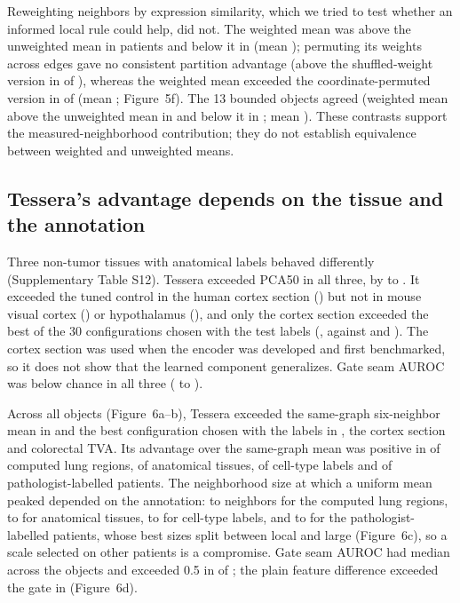 \documentclass[11pt]{article}
\begin{document}
Reweighting neighbors by expression similarity, which we tried to test whether an informed local rule could help, did not. The weighted mean was above the unweighted mean in \HerBndEUSixPos{} patients and below it in \HerBndEUSixNeg{} (mean \HerBndEUSixMean{}); permuting its weights across edges gave no consistent partition advantage (above the shuffled-weight version in \HerBndEShufPos{} of \HerPatients{}), whereas the weighted mean exceeded the coordinate-permuted version in \HerBndECoordPos{} of \HerPatients{} (mean \HerBndECoordMean{}; Figure~5f). The 13 bounded objects agreed (weighted mean above the unweighted mean in \DevAllThirteenEMeanPos{} and below it in \DevAllThirteenEMeanNeg{}; mean \DevAllThirteenEMeanMean{}). These contrasts support the measured-neighborhood contribution; they do not establish equivalence between weighted and unweighted means.





\subsection{Tessera's advantage depends on the tissue and the annotation}
Three non-tumor tissues with anatomical labels behaved differently (Supplementary Table S12). Tessera exceeded PCA50 in all three, by \BrPcaGainMin{} to \BrPcaGainMax{}. It exceeded the tuned control in the human cortex section (\BrCortexTessNested{}) but not in mouse visual cortex (\BrStarmapTessNested{}) or hypothalamus (\BrMerfishTessNested{}), and only the cortex section exceeded the best of the 30 configurations chosen with the test labels (\BrCortexTessOracle{}, against \BrStarmapTessOracle{} and \BrMerfishTessOracle{}). The cortex section was used when the encoder was developed and first benchmarked, so it does not show that the learned component generalizes. Gate seam AUROC was below chance in all three (\BrGateMin{} to \BrGateMax{}).

Across all \LandN{} objects (Figure~6a--b), Tessera exceeded the same-graph six-neighbor mean in \LandTessSamePos{} and the best configuration chosen with the labels in \LandTessOraclePos{}, the cortex section and colorectal TVA. Its advantage over the same-graph mean was positive in \LandComputedSamePos{} of \LandComputedN{} computed lung regions, \LandAnatSamePos{} of \LandAnatN{} anatomical tissues, \LandCellSamePos{} of \LandCellN{} cell-type labels and \LandPathSamePos{} of \LandPathN{} pathologist-labelled patients. The neighborhood size at which a uniform mean peaked depended on the annotation: \LandComputedKMin{} to \LandComputedKMax{} neighbors for the computed lung regions, \LandAnatKMin{} to \LandAnatKMax{} for anatomical tissues, \LandCellKMin{} to \LandCellKMax{} for cell-type labels, and \LandPathKMin{} to \LandPathKMax{} for the pathologist-labelled patients, whose best sizes split between local and large (Figure~6c), so a scale selected on other patients is a compromise. Gate seam AUROC had median \LandGateMedian{} across the objects and exceeded 0.5 in \LandGateAbove{} of \LandN{}; the plain feature difference exceeded the gate in \LandRawOverGate{} (Figure~6d).
\end{document}
